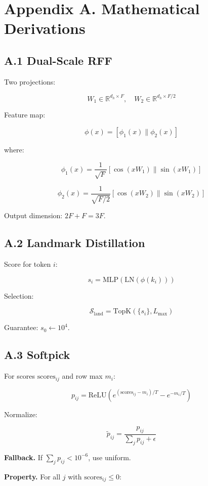 \section{Appendix A. Mathematical Derivations}

\subsection{A.1 Dual-Scale RFF}

Two projections:

\[
W_1 \in \mathbb{R}^{d_h \times F}, \quad W_2 \in \mathbb{R}^{d_h \times F/2}
\tag{A.1}
\]

Feature map:

\[
\phi(x) = [\phi_1(x) \| \phi_2(x)]
\tag{A.2}
\]

where:

\[
\phi_1(x) = \frac{1}{\sqrt{F}} [\cos(xW_1) \| \sin(xW_1)]
\tag{A.3}
\]

\[
\phi_2(x) = \frac{1}{\sqrt{F/2}} [\cos(xW_2) \| \sin(xW_2)]
\tag{A.4}
\]

Output dimension: $2F + F = 3F$.

\subsection{A.2 Landmark Distillation}

Score for token $i$:

\[
s_i = \text{MLP}(\text{LN}(\phi(k_i)))
\tag{A.5}
\]

Selection:

\[
\mathcal{S}_\text{land} = \text{TopK}(\{s_i\}, L_\text{max})
\tag{A.6}
\]

Guarantee: $s_0 \leftarrow 10^4$.

\subsection{A.3 Softpick}

For scores $\text{scores}_{ij}$ and row max $m_i$:

\[
p_{ij} = \text{ReLU}\!\left(e^{(\text{scores}_{ij} - m_i)/T} - e^{-m_i/T}\right)
\tag{A.7}
\]

Normalize:

\[
\tilde{p}_{ij} = \frac{p_{ij}}{\sum_j p_{ij} + \epsilon}
\tag{A.8}
\]

\textbf{Fallback.} If $\sum_j p_{ij} < 10^{-6}$, use uniform.

\textbf{Property.} For all $j$ with $\text{scores}_{ij} \leq 0$:

